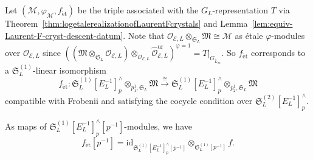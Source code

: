 Let $(\mathcal{M}, \varphi_{\mathcal{M}}, f_{\mathrm{\acute{e}t}})$ be the triple associated with the $G_L$-representation $T$ via Theorem~\ref{thm:logetalerealizationofLaurentFcrystals} and Lemma~\ref{lem:equiv-Laurent-F-cryst-descent-datum}. Note that $\mathcal{O}_{\mathcal{E}, L}\otimes_{\mathfrak{S}_L} \mathfrak{M} \cong \mathcal{M}$ as \'etale $\varphi$-modules over $\mathcal{O}_{\mathcal{E}, L}$ since $((\mathfrak{M}\otimes_{\mathfrak{S}_L} \mathcal{O}_{\mathcal{E}, L})\otimes_{\mathcal{O}_{\mathcal{E}, L}} \widehat{\mathcal{O}}_{\mathcal{E}, L}^{\mathrm{ur}})^{\varphi = 1} =  T|_{G_{\widetilde{L}_{\infty}}}$. So $f_{\mathrm{\acute{e}t}}$ corresponds to a $\mathfrak{S}_L^{(1)}$-linear isomorphism
\[
f_{\mathrm{\acute{e}t}}\colon \mathfrak{S}_L^{(1)}[E_L^{-1}]^{\wedge}_{p}\otimes_{p^1_1, \mathfrak{S}_L} \mathfrak{M} \stackrel{\cong}{\rightarrow} \mathfrak{S}_L^{(1)}[E_L^{-1}]^{\wedge}_p\otimes_{p^1_2, \mathfrak{S}_L} \mathfrak{M}
\]
compatible with Frobenii and satisfying the cocycle condition over $\mathfrak{S}_L^{(2)}[E_L^{-1}]^{\wedge}_{p}$.

\begin{prop} \label{prop:CDVR-Galois-reps-compatible}
As maps of $\mathfrak{S}_L^{(1)}[E_L^{-1}]^{\wedge}_p [p^{-1}]$-modules, we have 
\[
f_{\mathrm{\acute{e}t}}[p^{-1}]=\mathrm{id}_{\mathfrak{S}_L^{(1)}[E_L^{-1}]^{\wedge}_p[p^{-1}]}\otimes_{\mathfrak{S}_L^{(1)}[p^{-1}]} f.
\]
\end{prop} 

